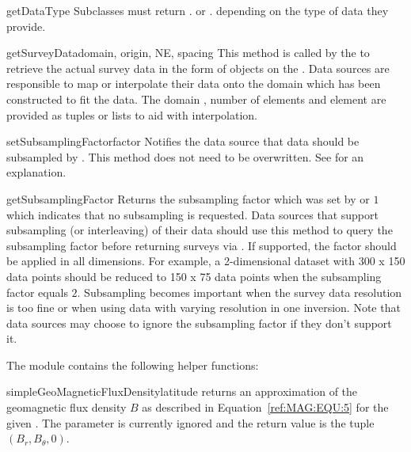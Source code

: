 \begin{methoddesc}[DataSource]{getDataType}{}
Subclasses must return . or
. depending on the type of data they provide.
\end{methoddesc}

\begin{methoddesc}[DataSource]{getSurveyData}{domain, origin, NE, spacing}
This method is called by the  to retrieve the actual survey
data in the form of \Data objects on the .
Data sources are responsible to map or interpolate their data onto the domain
which has been constructed to fit the data.
The domain , number of elements  and element
 are provided as tuples or lists to aid with interpolation.
\end{methoddesc}

\begin{methoddesc}[DataSource]{setSubsamplingFactor}{factor}
Notifies the data source that data should be subsampled by .
This method does not need to be overwritten.
See  for an explanation.
\end{methoddesc}

\begin{methoddesc}[DataSource]{getSubsamplingFactor}{}
Returns the subsampling factor which was set by 
or $1$ which indicates that no subsampling is requested.
Data sources that support subsampling (or interleaving) of their data should use
this method to query the subsampling factor before returning surveys via
. If supported, the factor should be applied in all
dimensions. For example, a 2-dimensional dataset with 300 x 150 data points
should be reduced to 150 x 75 data points when the subsampling factor equals $2$.
Subsampling becomes important when the survey data resolution is too fine or
when using data with varying resolution in one inversion.
Note that data sources may choose to ignore the subsampling factor if they
don't support it.
\end{methoddesc}

\vspace{1em}\noindent The  module contains the following helper
functions:

\begin{funcdesc}{simpleGeoMagneticFluxDensity}{latitude%
}
returns an approximation of the geomagnetic flux density $B$ as described in
Equation~\ref{ref:MAG:EQU:5} for the given .
The  parameter is currently ignored and the return value is
the tuple $(B_r, B_{\theta}, 0)$.
\end{funcdesc}

